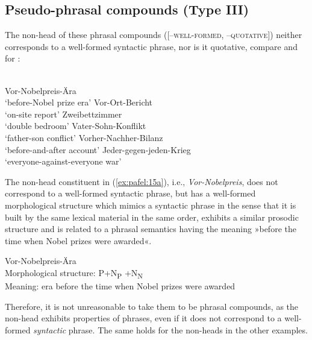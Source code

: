 \documentclass[output=paper]{LSP/langsci}
\begin{document}
\subsection{Pseudo-phrasal compounds (\textbf{Type III})}

The non-head of these phrasal compounds ([–\textsc{well-formed}, –\textsc{quotative}]) neither corresponds to a well-formed syntactic phrase, nor is it quotative, compare \citet[139]{Lawrenz2006} and \citet{Pafel2015} for :

\ea
      \\
      \ea\label{ex:pafel:15a}      
        Vor-Nobelpreis-Ära    \\
      \glt  `before-Nobel prize era'
      \ex\label{ex:pafel:15b}
        Vor-Ort-Bericht    \\
      \glt  `on-site report'
      \ex\label{ex:pafel:15c}
        Zweibettzimmer    \\
      \glt  `double bedroom'
      \ex\label{ex:pafel:15d}
        Vater-Sohn-Konflikt    \\
      \glt  `father-son conflict'
      \ex\label{ex:pafel:15e}
        Vorher-Nachher-Bilanz    \\
      \glt  `before-and-after account'
      \ex\label{ex:pafel:15f}
        Jeder-gegen-jeden-Krieg    \\
      \glt  `everyone-against-everyone war'
    \z
\z

The non-head constituent in (\ref{ex:pafel:15a}), i.e., \textit{Vor-Nobelpreis}, does not correspond to a well-formed syntactic phrase, but has a well-formed morphological structure which mimics a syntactic phrase in the sense that it is built by the same lexical material in the same order, exhibits a similar prosodic structure and is related to a phrasal semantics having the meaning »before the time when Nobel prizes were awarded«. 

\ea\label{ex:pafel:16}
        Vor-Nobelpreis-Ära   \\
      \glt  Morphological structure: {\ob}{\ob}P+N{\cb}\textsubscript{P} +N{\cb}\textsubscript{N}  \\
      \glt  Meaning: era before the time when Nobel prizes were awarded
\z

Therefore, it is not unreasonable to take them to be phrasal compounds, as the non-head exhibits properties of phrases, even if it does not correspond to a well-formed \textit{syntactic} phrase. The same holds for the non-heads in the other examples.
 
\end{document}
